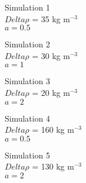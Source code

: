 \documentclass[fleqn,11pt]{article}
\begin{document}
\centering

Simulation 1 \\
$Delta\rho$ = 35 kg m$^{-3}$ \\
$a = 0.5$

Simulation 2 \\
$Delta\rho$ = 30 kg m$^{-3}$ \\
$a = 1$

Simulation 3 \\
$Delta\rho$ = 20 kg m$^{-3}$ \\
$a = 2$

Simulation 4 \\
$Delta\rho$ = 160 kg m$^{-3}$ \\
$a = 0.5$

Simulation 5 \\
$Delta\rho$ = 130 kg m$^{-3}$ \\
$a = 2$
\end{document}
